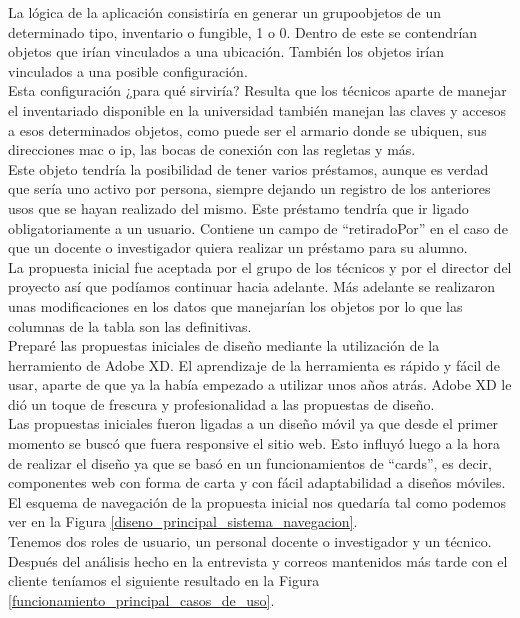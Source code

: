 La lógica de la aplicación consistiría en generar un grupoobjetos de un determinado tipo, inventario o fungible, 1 o 0. Dentro de este se contendrían objetos que irían vinculados a una ubicación. También los objetos irían vinculados a una posible configuración.
\\Esta configuración ¿para qué sirviría? Resulta que los técnicos aparte de manejar el inventariado disponible en la universidad también manejan las claves y accesos a esos determinados objetos, como puede ser el armario donde se ubiquen, sus direcciones mac o ip, las bocas de conexión con las regletas y más.
\\Este objeto tendría la posibilidad de tener varios préstamos, aunque es verdad que sería uno activo por persona, siempre dejando un registro de los anteriores usos que se hayan realizado del mismo. Este préstamo tendría que ir ligado obligatoriamente a un usuario. Contiene un campo de ``retiradoPor'' en el caso de que un docente o investigador quiera realizar un préstamo para su alumno.
\vspace{\baselineskip}
\\La propuesta inicial fue aceptada por el grupo de los técnicos y por el director del proyecto así que podíamos continuar hacia adelante. Más adelante se realizaron unas modificaciones en los datos que manejarían los objetos por lo que las columnas de la tabla son las definitivas.
\\Preparé las propuestas iniciales de diseño mediante la utilización de la herramiento de Adobe XD. El aprendizaje de la herramienta es rápido y fácil de usar, aparte de que ya la había empezado a utilizar unos años atrás. Adobe XD le dió un toque de frescura y profesionalidad a las propuestas de diseño.
\\Las propuestas iniciales fueron ligadas a un diseño móvil ya que desde el primer momento se buscó que fuera responsive el sitio web. Esto influyó luego a la hora de realizar el diseño ya que se basó en un funcionamientos de ``cards'', es decir, componentes web con forma de carta y con fácil adaptabilidad a diseños móviles.
\\El esquema de navegación de la propuesta inicial nos quedaría tal como podemos ver en la Figura \ref{diseno_principal_sistema_navegacion}.
\\Tenemos dos roles de usuario, un personal docente o investigador y un técnico. Después del análisis hecho en la entrevista y correos mantenidos más tarde con el cliente teníamos el siguiente resultado en la Figura \ref{funcionamiento_principal_casos_de_uso}.

